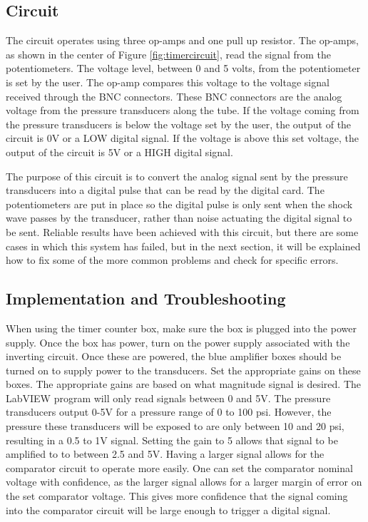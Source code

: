 \subsection{Circuit}
The circuit operates using three op-amps and one pull up resistor. The op-amps, as shown in the center of Figure \ref{fig:timercircuit}, read the signal from the potentiometers. The voltage level, between 0 and 5 volts, from the potentiometer is set by the user. The op-amp compares this voltage to the voltage signal received through the BNC connectors. These BNC connectors are the analog voltage from the pressure transducers along the tube. If the voltage coming from the pressure transducers is below the voltage set by the user, the output of the circuit is 0V or a LOW digital signal. If the voltage is above this set voltage, the output of the circuit is 5V or a HIGH digital signal. 

The purpose of this circuit is to convert the analog signal sent by the pressure transducers into a digital pulse that can be read by the digital card. The potentiometers are put in place so the digital pulse is only sent when the shock wave passes by the transducer, rather than noise actuating the digital signal to be sent. Reliable results have been achieved with this circuit, but there are some cases in which this system has failed, but in the next section, it will be explained how to fix some of the more common problems and check for specific errors.



\subsection{Implementation and Troubleshooting}

When using the timer counter box, make sure the box is plugged into the power supply. Once the box has power, turn on the power supply associated with the inverting circuit. Once these are powered, the blue amplifier boxes should be turned on to supply power to the transducers. Set the appropriate gains on these boxes. The appropriate gains are based on what magnitude signal is desired. The LabVIEW program will only read signals between 0 and 5V. The pressure transducers output 0-5V for a pressure range of 0 to 100 psi. However, the pressure these transducers will be exposed to are only between 10 and 20 psi, resulting in a 0.5 to 1V signal. Setting the gain to 5 allows that signal to be amplified to to between 2.5 and 5V. Having a larger signal allows for the comparator circuit to operate more easily. One can set the comparator nominal voltage with confidence, as the larger signal allows for a larger margin of error on the set comparator voltage. This gives more confidence that the signal coming into the comparator circuit will be large enough to trigger a digital signal. 

